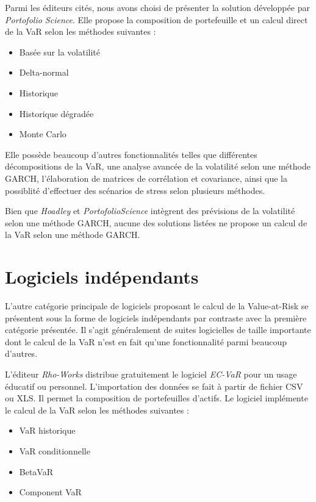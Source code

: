 		Parmi les éditeurs cités, nous avons choisi de présenter la solution développée par \textit{Portofolio Science}. Elle propose la composition de portefeuille et un calcul direct de la VaR selon les méthodes suivantes :
		\begin{itemize}
			\item Basée sur la volatilité
			\item Delta-normal
			\item Historique
			\item Historique dégradée
			\item Monte Carlo
		\end{itemize}

		Elle possède beaucoup d’autres fonctionnalités telles que différentes décompositions de la VaR, une analyse avancée de la volatilité selon une méthode GARCH, l’élaboration de matrices de corrélation et covariance, ainsi que la possiblité d’effectuer des scénarios de stress selon plusieurs méthodes. 

		Bien que \textit{Hoadley} et \textit{PortofolioScience} intègrent des prévisions de la volatilité selon une méthode GARCH, aucune des solutions listées ne propose un calcul de la VaR selon une méthode GARCH.


	\section{Logiciels indépendants}

		L’autre catégorie principale de logiciels proposant le calcul de la Value-at-Risk se présentent sous la forme de logiciels indépendants par contraste avec la première catégorie présentée. Il s’agit généralement de suites logicielles de taille importante dont le calcul de la VaR n’est en fait qu’une fonctionnalité parmi beaucoup d’autres.

		L’éditeur \textit{Rho-Works} distribue gratuitement le logiciel \textit{EC-VaR} pour un usage éducatif ou personnel. L’importation des données se fait à partir de fichier CSV ou XLS. Il permet la composition de portefeuilles d’actifs. Le logiciel implémente le calcul de la VaR selon les méthodes suivantes :
		\begin{itemize}
			\item VaR historique
			\item VaR conditionnelle
			\item BetaVaR
			\item Component VaR %
		\end{itemize}

